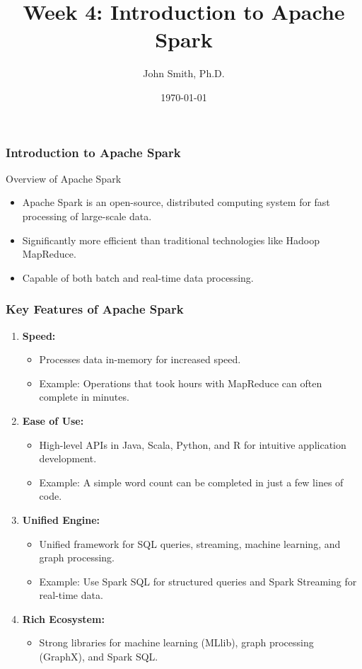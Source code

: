 \documentclass[aspectratio=169]{beamer}
\title[Week 4: Introduction to Apache Spark]{Week 4: Introduction to Apache Spark}
\author[J. Smith]{John Smith, Ph.D.}
\institute[University Name]{
  Department of Computer Science\\
  University Name\\
  \vspace{0.3cm}
  Email: email@university.edu\\
  Website: www.university.edu
}
\date{\today}
\begin{document}
\frame{\titlepage}

\begin{frame}[fragile]
    \frametitle{Introduction to Apache Spark}
    \begin{block}{Overview of Apache Spark}
        \begin{itemize}
            \item Apache Spark is an open-source, distributed computing system for fast processing of large-scale data.
            \item Significantly more efficient than traditional technologies like Hadoop MapReduce.
            \item Capable of both batch and real-time data processing.
        \end{itemize}
    \end{block}
\end{frame}

\begin{frame}[fragile]
    \frametitle{Key Features of Apache Spark}
    \begin{enumerate}
        \item \textbf{Speed:}
        \begin{itemize}
            \item Processes data in-memory for increased speed.
            \item Example: Operations that took hours with MapReduce can often complete in minutes.
        \end{itemize}

        \item \textbf{Ease of Use:}
        \begin{itemize}
            \item High-level APIs in Java, Scala, Python, and R for intuitive application development.
            \item Example: A simple word count can be completed in just a few lines of code.
        \end{itemize}

        \item \textbf{Unified Engine:}
        \begin{itemize}
            \item Unified framework for SQL queries, streaming, machine learning, and graph processing.
            \item Example: Use Spark SQL for structured queries and Spark Streaming for real-time data.
        \end{itemize}

        \item \textbf{Rich Ecosystem:}
        \begin{itemize}
            \item Strong libraries for machine learning (MLlib), graph processing (GraphX), and Spark SQL.
        \end{itemize}
    \end{enumerate}
\end{frame}
\end{document}
